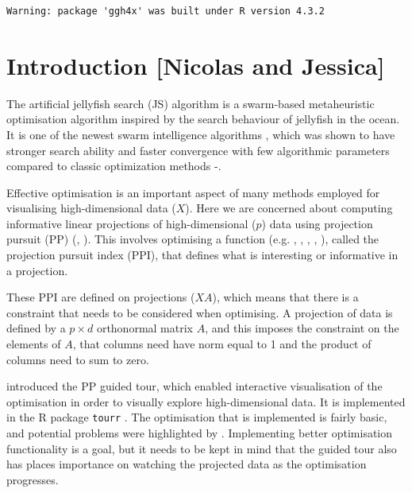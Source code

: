 \documentclass[
  number,
  preprint,
  3p]{elsarticle}
\begin{document}
\begin{verbatim}
Warning: package 'ggh4x' was built under R version 4.3.2
\end{verbatim}

\section{Introduction {[}Nicolas and
Jessica{]}}\label{introduction-nicolas-and-jessica}

The artificial jellyfish search (JS) algorithm \citep{chou_novel_2021}
is a swarm-based metaheuristic optimisation algorithm inspired by the
search behaviour of jellyfish in the ocean. It is one of the newest
swarm intelligence algorithms \citep{rajwar_exhaustive_2023}, which was
shown to have stronger search ability and faster convergence with few
algorithmic parameters compared to classic optimization methods
\citep{chou_novel_2021}-\citep{chou_recent_2022}.

Effective optimisation is an important aspect of many methods employed
for visualising high-dimensional data (\(X\)). Here we are concerned
about computing informative linear projections of high-dimensional
(\(p\)) data using projection pursuit (PP) (\citet{kr69}, \citet{FT74}).
This involves optimising a function (e.g. \citet{hall1989polynomial},
\citet{cook1993projection}, \citet{lee2010projection},
\citet{Loperfido2018}, \citet{Loperfido2020}), called the projection
pursuit index (PPI), that defines what is interesting or informative in
a projection.

These PPI are defined on projections (\(XA\)), which means that there is
a constraint that needs to be considered when optimising. A projection
of data is defined by a \(p\times d\) orthonormal matrix \(A\), and this
imposes the constraint on the elements of \(A\), that columns need have
norm equal to 1 and the product of columns need to sum to zero.

\citet{cook1995grand} introduced the PP guided tour, which enabled
interactive visualisation of the optimisation in order to visually
explore high-dimensional data. It is implemented in the R \citep{R}
package \texttt{tourr} \citep{tourr}. The optimisation that is
implemented is fairly basic, and potential problems were highlighted by
\citet{RJ-2021-105}. Implementing better optimisation functionality is a
goal, but it needs to be kept in mind that the guided tour also has
places importance on watching the projected data as the optimisation
progresses.
\end{document}
